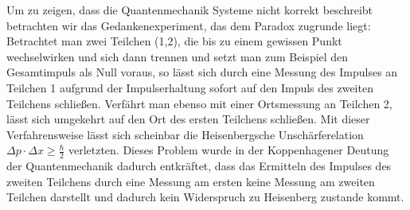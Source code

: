 \documentclass[twoside,colorback,accentcolor=tud4c,11pt]{tudreport}
\begin{document}
Um zu zeigen, dass die Quantenmechanik Systeme nicht korrekt beschreibt betrachten wir das Gedankenexperiment, das dem Paradox zugrunde liegt:
Betrachtet man zwei Teilchen (1,2), die bis zu einem gewissen Punkt wechselwirken und sich dann trennen und setzt man zum Beispiel den Gesamtimpuls als Null voraus, so lässt sich durch eine Messung des Impulses an Teilchen 1 aufgrund der Impulserhaltung sofort auf den Impuls des zweiten Teilchens schließen. Verfährt man ebenso mit einer Ortsmessung an Teilchen 2, lässt sich umgekehrt auf den Ort des ersten Teilchens schließen. Mit dieser Verfahrensweise lässt sich scheinbar die Heisenbergsche Unschärferelation $\Delta p\cdot\Delta x\geq\frac{\hbar}{2}$ verletzten. Dieses Problem wurde in der Koppenhagener Deutung der Quantenmechanik dadurch entkräftet, dass das Ermitteln des Impulses des zweiten Teilchens durch eine Messung am ersten keine Messung am zweiten Teilchen darstellt und dadurch kein Widerspruch zu Heisenberg zustande kommt.
\end{document}
